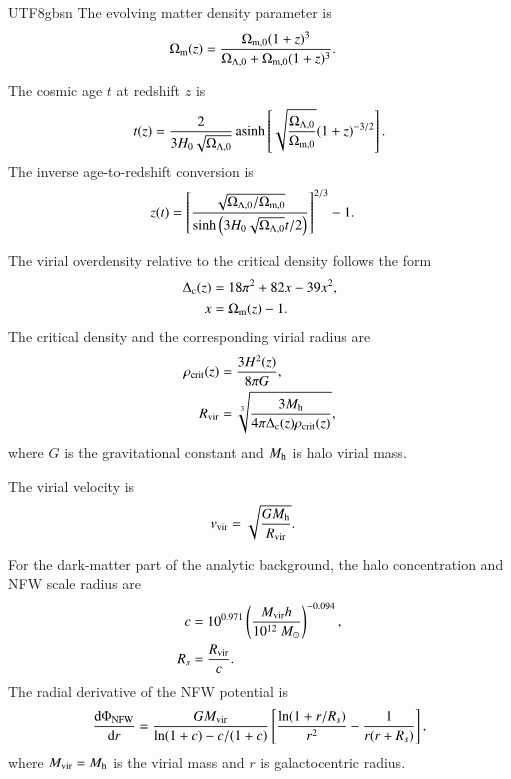 \documentclass[trackchanges, twocolappendix, twocolumn]{aastex701}
\begin{document}
\begin{CJK*}{UTF8}{gbsn}
The evolving matter density parameter is
\begin{align}
\Omega_{\rm m}(z) &=
\dfrac{\Omega_{\rm m,0}(1+z)^3}
{\Omega_{\Lambda,0}+\Omega_{\rm m,0}(1+z)^3}.
\end{align}

The cosmic age $t$ at redshift $z$ is
\begin{align}
t(z) = \dfrac{2}{3 H_0 \sqrt{\Omega_{\Lambda,0}}} \operatorname{asinh} \left[ \sqrt{\dfrac{\Omega_{\Lambda,0}}{\Omega_{\rm m,0}}} (1 + z)^{-3/2} \right] .
\end{align}
The inverse age-to-redshift conversion is
\begin{align}
z(t) &= \left[ \dfrac{\sqrt{\Omega_{\Lambda, 0} / \Omega_{\rm m, 0}}}{\sinh \left( 3 H_0 \sqrt{\Omega_{\Lambda,0}} t / 2 \right)} \right]^{2/3} - 1 .
\end{align}

The virial overdensity relative to the critical density follows the \cite{Bryan&Norman1998DM} form
\begin{align}
\Delta_{\rm c} (z) & = 18 \pi^2 + 82 x - 39 x^2 , \\
x &= \Omega_{\rm m}(z)-1 .
\end{align}
The critical density and the corresponding virial radius are
\begin{align}
\rho_{\rm crit} (z) & = \dfrac{3 H^2 (z)}{8 \pi G} , \\
R_{\rm vir} & = \sqrt[3]{ \dfrac{3 M_{\rm h}}{4\pi \Delta_{\rm c} (z) \rho_{\rm crit} (z)} } ,
\end{align}
where $G$ is the gravitational constant and $M_{\rm h}$ is halo virial mass.

The virial velocity is
\begin{align}
v_{\rm vir} & = \sqrt{\dfrac{G M_{\rm h}}{R_{\rm vir}}} .
\end{align}

For the dark-matter part of the analytic background, the halo concentration \citep{Maccio+2008DM} and NFW \citep{Navarro&Frenk&White1997DM} scale radius are
\begin{align}
c & = 10^{0.971} \left( \dfrac{M_{\rm vir} h}{10^{12}~M_\odot} \right)^{-0.094},\\
R_s & = \dfrac{R_{\rm vir}}{c}.
\end{align}
The radial derivative of the NFW potential is
\begin{align}
\dfrac{\mathrm{d} \Phi_{\rm NFW}}{\mathrm{d} r} = \dfrac{G M_{\rm vir}}{\ln (1 + c) - c / (1 + c)} \left[ \dfrac{\ln (1 + r / R_s)}{r^2} - \dfrac{1}{r (r + R_s)} \right] ,
\end{align}
where $M_{\rm vir} = M_{\rm h}$ is the virial mass and $r$ is galactocentric radius.


\end{CJK*}
\end{document}
